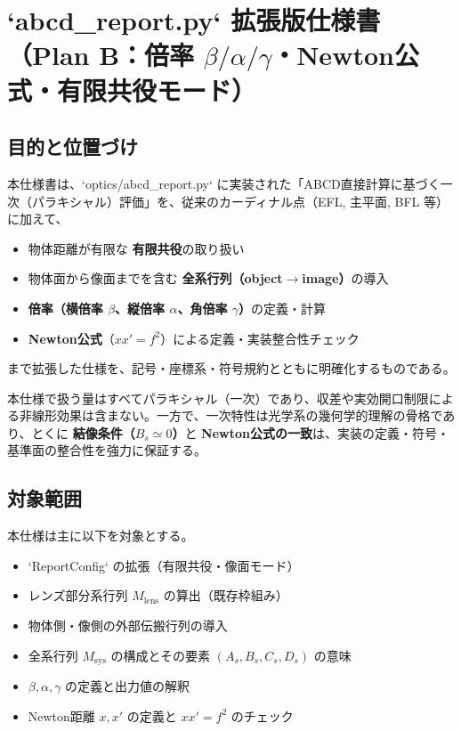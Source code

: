 

\section*{`abcd\_report.py` 拡張版仕様書（Plan B：倍率 $\beta/\alpha/\gamma$・Newton公式・有限共役モード）}

\subsection*{目的と位置づけ}
本仕様書は、`optics/abcd_report.py` に実装された「ABCD直接計算に基づく一次（パラキシャル）評価」を、従来のカーディナル点（EFL, 主平面, BFL 等）に加えて、
\begin{itemize}
  \item 物体距離が有限な \textbf{有限共役}の取り扱い
  \item 物体面から像面までを含む \textbf{全系行列（object$\to$image）}の導入
  \item \textbf{倍率（横倍率 $\beta$、縦倍率 $\alpha$、角倍率 $\gamma$）}の定義・計算
  \item \textbf{Newton公式}（$x x' = f^2$）による定義・実装整合性チェック
\end{itemize}
まで拡張した仕様を、記号・座標系・符号規約とともに明確化するものである。

本仕様で扱う量はすべてパラキシャル（一次）であり、収差や実効開口制限による非線形効果は含まない。一方で、一次特性は光学系の幾何学的理解の骨格であり、とくに \textbf{結像条件（$B_s\simeq 0$）}と \textbf{Newton公式の一致}は、実装の定義・符号・基準面の整合性を強力に保証する。

\subsection*{対象範囲}
本仕様は主に以下を対象とする。
\begin{itemize}
  \item `ReportConfig` の拡張（有限共役・像面モード）
  \item レンズ部分系行列 $M_{\mathrm{lens}}$ の算出（既存枠組み）
  \item 物体側・像側の外部伝搬行列の導入
  \item 全系行列 $M_{\mathrm{sys}}$ の構成とその要素 $(A_s,B_s,C_s,D_s)$ の意味
  \item $\beta,\alpha,\gamma$ の定義と出力値の解釈
  \item Newton距離 $x,x'$ の定義と $x x' = f^2$ のチェック
\end{itemize}


